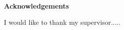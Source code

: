 \mbox{}\newline\vspace{10mm} \mbox{}\LARGE
%
{\bf Acknowledgements} \normalsize \vspace{5mm}

I would like to thank my supervisor.....
